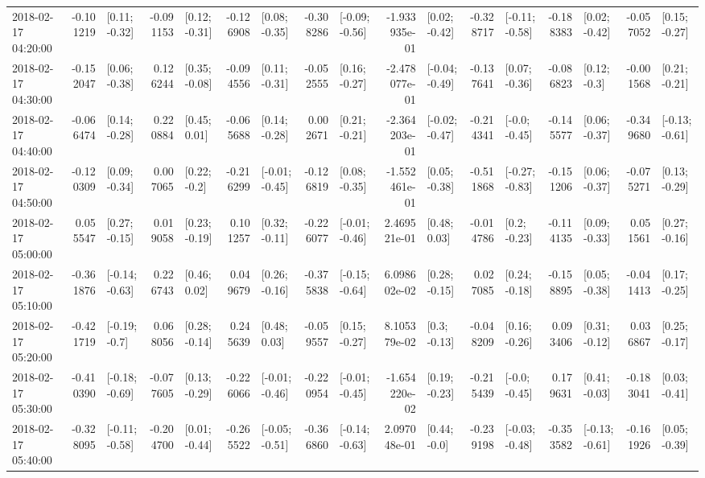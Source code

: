 \begin{tabular}{lrlrlrlrlrlrlrlrl}
2018-02-17 04:20:00 & -0.101219 &   [0.11; -0.32] & -0.091153 &   [0.12; -0.31] & -0.126908 &   [0.08; -0.35] & -0.308286 &  [-0.09; -0.56] & -1.933935e-01 &   [0.02; -0.42] & -0.328717 &  [-0.11; -0.58] & -0.188383 &   [0.02; -0.42] & -0.057052 &   [0.15; -0.27] \\
2018-02-17 04:30:00 & -0.152047 &   [0.06; -0.38] &  0.126244 &   [0.35; -0.08] & -0.094556 &   [0.11; -0.31] & -0.052555 &   [0.16; -0.27] & -2.478077e-01 &  [-0.04; -0.49] & -0.137641 &   [0.07; -0.36] & -0.086823 &    [0.12; -0.3] & -0.001568 &   [0.21; -0.21] \\
2018-02-17 04:40:00 & -0.066474 &   [0.14; -0.28] &  0.220884 &    [0.45; 0.01] & -0.065688 &   [0.14; -0.28] &  0.002671 &   [0.21; -0.21] & -2.364203e-01 &  [-0.02; -0.47] & -0.214341 &   [-0.0; -0.45] & -0.145577 &   [0.06; -0.37] & -0.349680 &  [-0.13; -0.61] \\
2018-02-17 04:50:00 & -0.120309 &   [0.09; -0.34] &  0.007065 &    [0.22; -0.2] & -0.216299 &  [-0.01; -0.45] & -0.126819 &   [0.08; -0.35] & -1.552461e-01 &   [0.05; -0.38] & -0.511868 &  [-0.27; -0.83] & -0.151206 &   [0.06; -0.37] & -0.075271 &   [0.13; -0.29] \\
2018-02-17 05:00:00 &  0.055547 &   [0.27; -0.15] &  0.019058 &   [0.23; -0.19] &  0.101257 &   [0.32; -0.11] & -0.226077 &  [-0.01; -0.46] &  2.469521e-01 &    [0.48; 0.03] & -0.014786 &    [0.2; -0.23] & -0.114135 &   [0.09; -0.33] &  0.051561 &   [0.27; -0.16] \\
2018-02-17 05:10:00 & -0.361876 &  [-0.14; -0.63] &  0.226743 &    [0.46; 0.02] &  0.049679 &   [0.26; -0.16] & -0.375838 &  [-0.15; -0.64] &  6.098602e-02 &   [0.28; -0.15] &  0.027085 &   [0.24; -0.18] & -0.158895 &   [0.05; -0.38] & -0.041413 &   [0.17; -0.25] \\
2018-02-17 05:20:00 & -0.421719 &   [-0.19; -0.7] &  0.068056 &   [0.28; -0.14] &  0.245639 &    [0.48; 0.03] & -0.059557 &   [0.15; -0.27] &  8.105379e-02 &    [0.3; -0.13] & -0.048209 &   [0.16; -0.26] &  0.093406 &   [0.31; -0.12] &  0.036867 &   [0.25; -0.17] \\
2018-02-17 05:30:00 & -0.410390 &  [-0.18; -0.69] & -0.077605 &   [0.13; -0.29] & -0.226066 &  [-0.01; -0.46] & -0.220954 &  [-0.01; -0.45] & -1.654220e-02 &   [0.19; -0.23] & -0.215439 &   [-0.0; -0.45] &  0.179631 &   [0.41; -0.03] & -0.183041 &   [0.03; -0.41] \\
2018-02-17 05:40:00 & -0.328095 &  [-0.11; -0.58] & -0.204700 &   [0.01; -0.44] & -0.265522 &  [-0.05; -0.51] & -0.366860 &  [-0.14; -0.63] &  2.097048e-01 &    [0.44; -0.0] & -0.239198 &  [-0.03; -0.48] & -0.353582 &  [-0.13; -0.61] & -0.161926 &   [0.05; -0.39] \\

\end{tabular}
